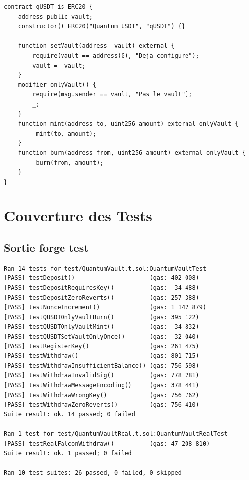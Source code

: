 \documentclass[11pt,a4paper]{article}
\begin{document}
\begin{lstlisting}[style=solidity, caption={qUSDT --- token de recu quantique}]
contract qUSDT is ERC20 {
    address public vault;
    constructor() ERC20("Quantum USDT", "qUSDT") {}

    function setVault(address _vault) external {
        require(vault == address(0), "Deja configure");
        vault = _vault;
    }
    modifier onlyVault() {
        require(msg.sender == vault, "Pas le vault");
        _;
    }
    function mint(address to, uint256 amount) external onlyVault {
        _mint(to, amount);
    }
    function burn(address from, uint256 amount) external onlyVault {
        _burn(from, amount);
    }
}
\end{lstlisting}

\section{Couverture des Tests}

\subsection{Sortie forge test}

\begin{lstlisting}[style=bash, caption={Sortie complete forge test -vv}]
Ran 14 tests for test/QuantumVault.t.sol:QuantumVaultTest
[PASS] testDeposit()                     (gas: 402 008)
[PASS] testDepositRequiresKey()          (gas:  34 488)
[PASS] testDepositZeroReverts()          (gas: 257 388)
[PASS] testNonceIncrement()              (gas: 1 142 879)
[PASS] testQUSDTOnlyVaultBurn()          (gas: 395 122)
[PASS] testQUSDTOnlyVaultMint()          (gas:  34 832)
[PASS] testQUSDTSetVaultOnlyOnce()       (gas:  32 040)
[PASS] testRegisterKey()                 (gas: 261 475)
[PASS] testWithdraw()                    (gas: 801 715)
[PASS] testWithdrawInsufficientBalance() (gas: 756 598)
[PASS] testWithdrawInvalidSig()          (gas: 778 281)
[PASS] testWithdrawMessageEncoding()     (gas: 378 441)
[PASS] testWithdrawWrongKey()            (gas: 756 762)
[PASS] testWithdrawZeroReverts()         (gas: 756 410)
Suite result: ok. 14 passed; 0 failed

Ran 1 test for test/QuantumVaultReal.t.sol:QuantumVaultRealTest
[PASS] testRealFalconWithdraw()          (gas: 47 208 810)
Suite result: ok. 1 passed; 0 failed

Ran 10 test suites: 26 passed, 0 failed, 0 skipped
\end{lstlisting}
\end{document}
